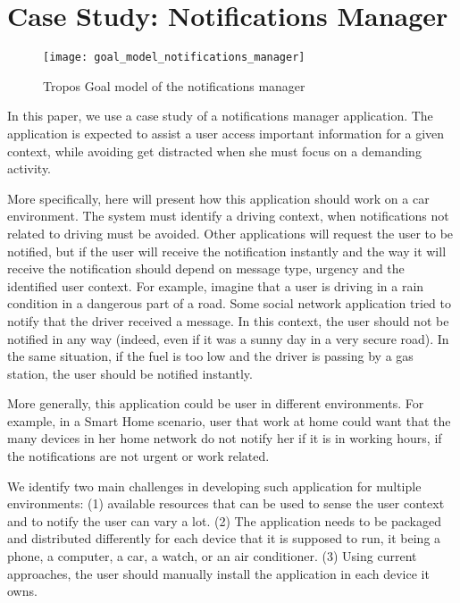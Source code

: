 \section{Case Study: Notifications Manager}
\label{sec:notifications_manager}

\begin{figure*}[!htb]
 \centering
 \texttt{[image: goal\_model\_notifications\_manager]}
 \caption{Tropos Goal model of the notifications manager}
\label{fig:goal_model_distraction_manager}
\end{figure*}

In this paper, we use a case study of a notifications manager application. The application is expected to assist a user access important information for a given context, while avoiding get distracted when she must focus on a demanding activity.

More specifically, here will present how this application should work on a car environment.
The system must identify a driving context, when notifications not related to driving must be avoided.
Other applications will request the user to be notified, but if the user will receive the notification instantly and the way it will receive the notification should depend on message type, urgency and the identified user context.
For example, imagine that a user is driving in a rain condition in a dangerous part of a road.
Some social network application tried to notify that the driver received a message. In this context, the user should not be notified in any way (indeed, even if it was a sunny day in a very secure road).
In the same situation, if the fuel is too low and the driver is passing by a gas station, the user should be notified instantly.

More generally, this application could be user in different environments. For example, in a Smart Home scenario, user that work at home could want that the many devices in her home network do not notify her if it is in working hours, if the notifications are not urgent or work related.

We identify two main challenges in developing such application for multiple environments: (1) available resources that can be used to sense the user context and to notify the user can vary a lot. (2) The application needs to be packaged and distributed differently for each device that it is supposed to run, it being a phone, a computer, a car, a watch, or an air conditioner. (3) Using current approaches, the user should manually install the application in each device it owns.
